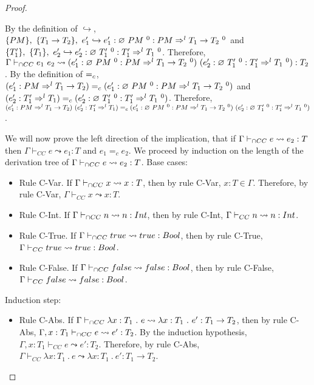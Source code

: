 \documentclass[a4paper]{article}
\begin{document}
\begin{proof}
\begin{itemize}
    By the definition of $\hookrightarrow$, $\{PM\},\ \{T_1 \rightarrow T_2\},\ e_1' \hookrightarrow e_1' : \varnothing\ PM\ ^{0} : PM \Rightarrow^l T_1 \rightarrow T_2\ ^0$ and $\{T_1'\},\ \{T_1\},\ e_2' \hookrightarrow e_2' : \emptycast{T_1'}{0} : T_1' \Rightarrow^l T_1\ ^0$.
    Therefore, $\Gamma \vdash_{\cap CC} e_1\ e_2 \leadsto (e_1' : \varnothing\ PM\ ^{0} : PM \Rightarrow^l T_1 \rightarrow T_2\ ^0)\ (e_2' : \varnothing\ T_1'\ ^{0} : T_1' \Rightarrow^l T_1\ ^0) : T_2$.
    By the definition of $=_c$, $(e_1' : PM \Rightarrow^l T_1 \rightarrow T_2) =_c (e_1' : \varnothing\ PM\ ^{0} : PM \Rightarrow^l T_1 \rightarrow T_2\ ^0)$ and $(e_2' : T_1' \Rightarrow^l T_1) =_c (e_2' : \varnothing\ T_1'\ ^{0} : T_1' \Rightarrow^l T_1\ ^0)$.
    Therefore, $(e_1' : PM \Rightarrow^l T_1 \rightarrow T_2)\ (e_2' : T_1' \Rightarrow^l T_1) \equalityCasts (e_1' : \emptycast{PM}{0} : PM \Rightarrow^l T_1 \rightarrow T_2\ ^0)\ (e_2' : \emptycast{T_1'}{0} : T_1' \Rightarrow^l T_1\ ^0)$.
\end{itemize}
We will now prove the left direction of the implication, that if $\Gamma \vdash_{\cap CC} e \leadsto e_2 : T$ then $\Gamma \vdash_{CC} e \leadsto e_1 : T$ and $e_1 =_{c} e_2$.
We proceed by induction on the length of the derivation tree of $\Gamma \vdash_{\cap CC} e \leadsto e_2 : T$.
Base cases:
\begin{itemize}
    \item Rule C-Var.
    If $\Gamma \vdash_{\cap CC} x \leadsto x : T$, then by rule C-Var, $x : T \in \Gamma$.
    Therefore, by rule C-Var, $\Gamma \vdash_{CC} x \leadsto x : T$.
    \item Rule C-Int.
    If $\Gamma \vdash_{\cap CC} n \leadsto n : {Int}$, then by rule C-Int, $\Gamma \vdash_{CC} n \leadsto n : {Int}$.
    \item Rule C-True.
    If $\Gamma \vdash_{\cap CC} true \leadsto true : Bool$, then by rule C-True, $\Gamma \vdash_{CC} true \leadsto true : Bool$.
    \item Rule C-False.
    If $\Gamma \vdash_{\cap CC} false \leadsto false : Bool$, then by rule C-False, $\Gamma \vdash_{CC} false \leadsto false : Bool$.
\end{itemize}
Induction step:
\begin{itemize}
    \item Rule C-Abs.
    If $\Gamma \vdash_{\cap CC} \lambda x : T_1\ .\ e \leadsto \lambda x : T_1\ .\ e' : T_1 \rightarrow T_2$, then by rule C-Abs, $\Gamma, x : T_1 \vdash_{\cap CC} e \leadsto e' : T_2$.
    By the induction hypothesis, $\Gamma, x : T_1 \vdash_{CC} e \leadsto e' : T_2$.
    Therefore, by rule C-Abs, $\Gamma \vdash_{CC} \lambda x : T_1\ .\ e \leadsto \lambda x : T_1\ .\ e' : T_1 \rightarrow T_2$.

\end{itemize}
\end{proof}
\end{document}
